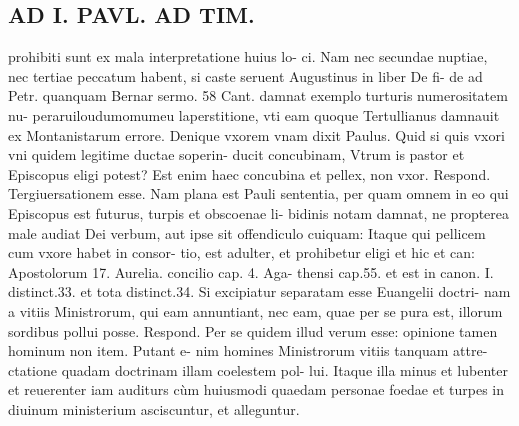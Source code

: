 \documentclass{article}
\begin{document}
\begin{pages}
\section*{AD I. PAVL. AD TIM. }
\marginpar{[ p.110 ]}\pstart prohibiti sunt ex mala interpretatione huius lo- ci. Nam nec secundae nuptiae, nec tertiae peccatum habent, si caste seruent Augustinus in liber  De fi- de ad Petr. quanquam Bernar sermo. 58 Cant. damnat exemplo turturis numerositatem nu- peraruiloudumomumeu laperstitione, vti eam quoque Tertullianus damnauit ex Montanistarum errore.  \pend\pstart Denique vxorem vnam dixit Paulus. Quid si quis vxori vni quidem legitime ductae soperin- ducit concubinam, Vtrum is pastor et Episcopus eligi potest? Est enim haec concubina et pellex, non vxor. Respond. Tergiuersationem esse. Nam plana est Pauli sententia, per quam omnem in eo qui Episcopus est futurus, turpis et obscoenae li- bidinis notam damnat, ne propterea male audiat Dei verbum, aut ipse sit offendiculo cuiquam: Itaque qui pellicem cum vxore habet in consor- tio, est adulter, et prohibetur eligi et hic et can: Apostolorum 17. Aurelia. concilio cap. 4. Aga- thensi cap.55. et est in canon. I. distinct.33. et tota distinct.34.  \pend\pstart Si excipiatur separatam esse Euangelii doctri- nam a vitiis Ministrorum, qui eam annuntiant, nec eam, quae per se pura est, illorum sordibus pollui posse. Respond. Per se quidem illud verum esse: opinione tamen hominum non item. Putant e- nim homines Ministrorum vitiis tanquam attre- ctatione quadam doctrinam illam coelestem pol- lui. Itaque illa minus et lubenter et reuerenter iam auditurs cùm huiusmodi quaedam personae foedae et turpes in diuinum ministerium asciscuntur, et alleguntur.  \pend

\end{pages}
\end{document}
